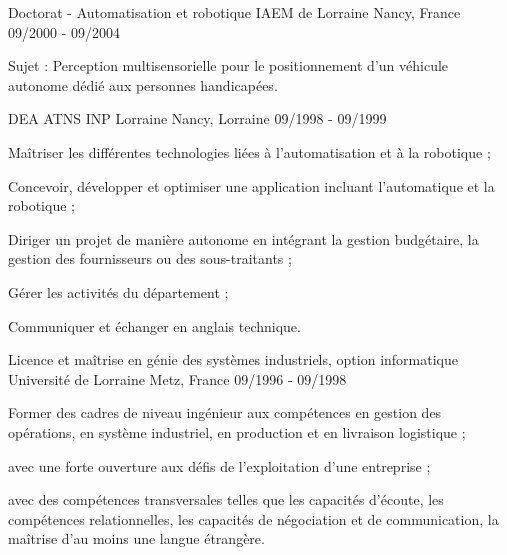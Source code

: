 
\begin{cventries}

  \cventry
    {Doctorat - Automatisation et robotique} %
    {IAEM de Lorraine} %
    {Nancy, France} %
    {09/2000 - 09/2004} %
    {
      \begin{cvitems} %
        \item {Sujet : Perception multisensorielle pour le positionnement d'un véhicule autonome dédié aux personnes handicapées.}
      \end{cvitems}
    }
  
  \cventry
    {DEA ATNS}
    {INP Lorraine} %
    {Nancy, Lorraine} %
    {09/1998 - 09/1999} %
    {
      \begin{cvitems} %
        \item {Maîtriser les différentes technologies liées à l'automatisation et à la robotique ;}
        \item {Concevoir, développer et optimiser une application incluant l'automatique et la robotique ;}
        \item {Diriger un projet de manière autonome en intégrant la gestion budgétaire, la gestion des fournisseurs ou des sous-traitants ;}
        \item {Gérer les activités du département ;}
        \item {Communiquer et échanger en anglais technique.}
      \end{cvitems}
    }

  \cventry
    {Licence et maîtrise en génie des systèmes industriels, option informatique} %
    {Université de Lorraine} %
    {Metz, France} %
    {09/1996 - 09/1998} %
    {
      \begin{cvitems} %
        \item {Former des cadres de niveau ingénieur aux compétences en gestion des opérations, en système industriel, en production et en livraison logistique ;}
        \item {avec une forte ouverture aux défis de l’exploitation d’une entreprise ;} 
        \item {avec des compétences transversales telles que les capacités d'écoute, les compétences relationnelles, les capacités de négociation et de communication, la maîtrise d'au moins une langue étrangère.}
      \end{cvitems}
    }


\end{cventries}
